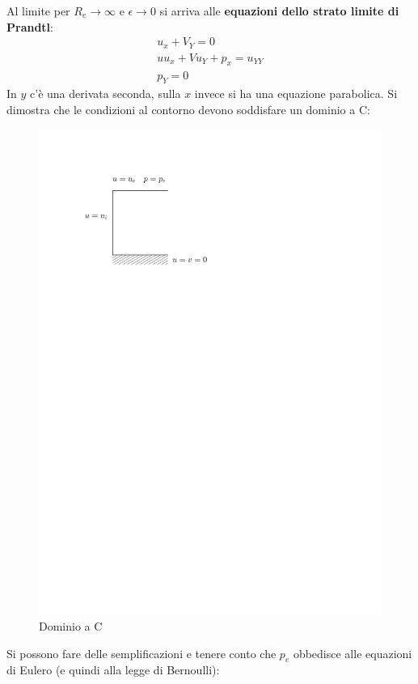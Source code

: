 Al limite per $R_e \rightarrow \infty$ e $\epsilon \rightarrow 0$ si arriva alle \textbf{equazioni dello strato limite di Prandtl}:
%
	\begin{equation*}
		\begin{gathered}
			u_x + V_Y = 0\\
			u u_x + V u_Y + p_x = u_{YY}\\
			p_Y = 0
		\end{gathered}
	\end{equation*}
%
In $y$ c'è una derivata seconda, sulla $x$ invece si ha una equazione parabolica.
Si dimostra che le condizioni al contorno devono soddisfare un dominio a C:
	\begin{figure}[ht]
		\includegraphics[scale=0.7]{./7.4 Strato limite/7.4-2}
		\centering
		\caption{Dominio a C}
	\end{figure}
%
Si possono fare delle semplificazioni e tenere conto che $p_e$ obbedisce alle equazioni di Eulero (e quindi alla legge di Bernoulli):
